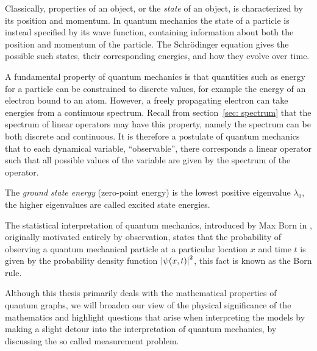 Classically, properties of an object, or the \emph{state} of an object, is characterized by its position and momentum. In quantum mechanics the state of a particle is instead specified by its wave function, containing information about both the position and momentum of the particle. The Schrödinger equation gives the possible such states, their corresponding energies, and how they evolve over time.

A fundamental property of quantum mechanics is that quantities such as energy for a particle can be constrained to discrete values, for example the energy of an electron bound to an atom. However, a freely propagating electron can take energies from a continuous spectrum. Recall from section~\ref{sec: spectrum} that the spectrum of linear operators may have this property, namely the spectrum can be both discrete and continuous. It is therefore a postulate of quantum mechanics that to each dynamical variable, ``observable'', there corresponds a linear operator such that all possible values of the variable are given by the spectrum of the operator.

The \emph{ground state energy} (zero-point energy) is the lowest positive eigenvalue $\lambda_0$, the higher eigenvalues are called excited state energies.


The statistical interpretation of quantum mechanics, introduced by Max Born in \cite{born statistical interpretation}, originally motivated entirely by observation, states that the probability of observing a quantum mechanical particle at a particular location $x$ and time $t$ is given by the probability density function $\left\lvert\psi(x,t)\right\rvert^2$, this fact is known as the Born rule.

Although this thesis primarily deals with the mathematical properties of quantum graphs, we will broaden our view of the physical significance of the mathematics and highlight questions that arise when interpreting the models by making a slight detour into the interpretation of quantum mechanics, by discussing the so called measurement problem.

